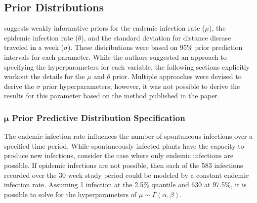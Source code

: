 \documentclass{uwstat572}
\begin{document}
\subsection{Prior Distributions}
\citet{Brown} suggests weakly informative priors for the endemic infection rate ($\mu$), the epidemic infection rate ($\theta$), and the standard deviation for distance disease traveled in a week ($\sigma$). 
These distributions were based on 95\% prior prediction intervals for each parameter. 
While the authors suggested an approach to specifying the hyperparameters for each variable, the following sections explicitly workout the details for the $\mu$ and $\theta$ prior. 
Multiple approaches were devised to derive the $\sigma$ prior hyperparameters; however, it was not possible to derive the results for this parameter based on the method published in the paper. 

\subsubsection{$\boldsymbol{\mu}$ Prior Predictive Distribution Specification}
The endemic infection rate influences the number of spontaneous infections over a specified time period. 
While spontaneously infected plants have the capacity to produce new infections, consider the case where only endemic infections are possible.
If epidemic infections are not possible, then each of the 583 infections recorded over the 30 week study period could be modeled by a constant endemic infection rate. 
Assuming 1 infection at the 2.5\% quantile and 630 at 97.5\%, it is possible to solve for the hyperparameters of $\mu \sim \Gamma(\alpha, \beta)$. 
\end{document}
